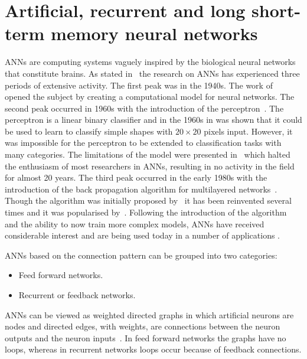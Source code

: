 \section{Artificial, recurrent and long short-term memory neural networks}\label{section:artificial_neural_networks}

ANNs are computing systems vaguely inspired by the biological neural networks
that constitute brains. As stated in~\cite{Jain1996} the research on ANNs
has experienced three periods of extensive activity. The first peak was in the
1940s. The work of~\cite{McCulloch1943} opened the subject by creating a
computational model for neural networks. The second peak occurred in 1960s with
the introduction of the perceptron~\cite{Rosenblatt1958}. The perceptron is a
linear binary classifier and in the 1960s in was shown that it could be used to
learn to classify simple shapes with \(20\times20\) pixels input. However, it
was impossible for the perceptron to be extended to classification tasks with
many categories. The limitations of the model were presented
in~\cite{Minsky1969} which halted the enthusiasm of most researchers in ANNs,
resulting in no activity in the field for almost 20 years. The third peak occurred
in the early 1980s with the introduction of the back propagation algorithm for
multilayered networks~\cite{Werbos1974}. Though the algorithm was initially
proposed by~\cite{Werbos1974} it has been reinvented several times and it was
popularised by~\cite{McClelland1986}. Following the introduction of the
algorithm and the ability to now train more complex models, ANNs have received
considerable interest and are being used today in a number of applications
\cite{Covington2016, Kalogirou2000}.

ANNs based on the connection pattern can be grouped into two categories:

\begin{itemize}
    \item Feed forward networks.
    \item Recurrent or feedback networks.
\end{itemize}

ANNs can be viewed as weighted directed graphs in which artificial neurons are
nodes and directed edges, with weights, are connections between the neuron
outputs and the neuron inputs~\cite{Jain1996}. In feed forward networks the
graphs have no loops, whereas in recurrent networks loops occur because of feedback
connections. %

